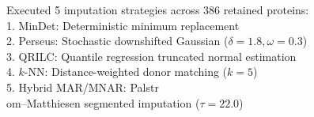 \documentclass[11pt,oneside]{book}
\begin{document}
\begin{routput}
Executed 5 imputation strategies across 386 retained proteins:\\
\hspace*{1em}1. MinDet: Deterministic minimum replacement\\
\hspace*{1em}2. Perseus: Stochastic downshifted Gaussian ($\delta = 1.8, \omega = 0.3$)\\
\hspace*{1em}3. QRILC: Quantile regression truncated normal estimation\\
\hspace*{1em}4. $k$-NN: Distance-weighted donor matching ($k = 5$)\\
\hspace*{1em}5. Hybrid MAR/MNAR: Palstr{\\o}m--Matthiesen segmented imputation ($\tau = 22.0$)
\end{routput}
\end{document}
